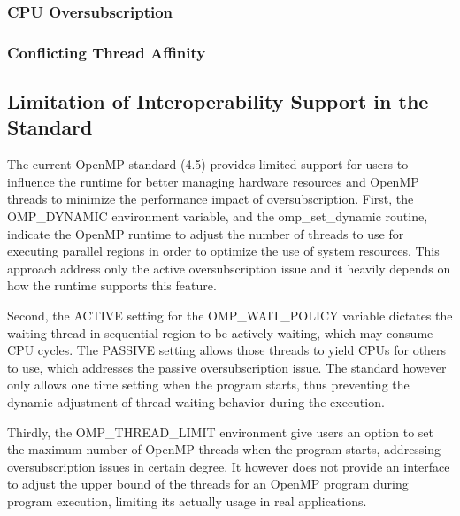 \subsubsection{CPU Oversubscription}


\subsubsection{Conflicting Thread Affinity}


\subsection{Limitation of Interoperability Support in the Standard}
The current OpenMP standard (4.5) provides limited support for users to influence the runtime for 
better managing hardware resources and OpenMP threads to minimize the performance impact of oversubscription.
First, the {\sf OMP\_DYNAMIC} environment variable, %
and the {\sf omp\_set\_dynamic} %
 routine, indicate the OpenMP runtime to adjust the number of threads to use for executing parallel
regions in order to optimize the use of system resources. 
This approach address only the active oversubscription issue and it heavily depends on how the runtime supports this feature. 

Second, the {\sf ACTIVE} setting for the {\sf OMP\_WAIT\_POLICY} variable %
dictates the waiting thread in sequential region to be actively waiting, which may consume CPU cycles.
The {\sf PASSIVE} setting allows those threads to yield CPUs for others to use, which addresses the passive 
oversubscription issue. The standard however only allows one time setting when the program starts, thus 
preventing the dynamic adjustment of thread waiting behavior during the execution. 

Thirdly, the {\sf OMP\_THREAD\_LIMIT} environment %
give users an option to  
 set the maximum number of OpenMP threads when the program starts, addressing oversubscription issues in certain
 degree. It however does not provide an interface to adjust the upper bound of the threads for an OpenMP program during program execution, limiting
 its actually usage in real applications. 

